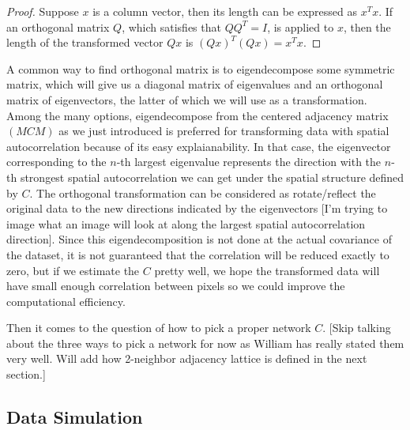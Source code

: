 \documentclass[12pt]{article}
\begin{document}
\begin{proof}
  Suppose \( x \) is a column vector, then its length can be expressed as \( x^T x \). If an orthogonal matrix \( Q \), which satisfies that \( Q Q^T = I \), is applied to \( x \), then the length of the transformed vector \( Q x \) is \( (Q x)^T (Q x) = x^T x \).
\end{proof}

A common way to find orthogonal matrix is to eigendecompose some symmetric matrix, which will give us a diagonal matrix of eigenvalues and an orthogonal matrix of eigenvectors, the latter of which we will use as a transformation. Among the many options, eigendecompose from the centered adjacency matrix \( (M C M) \) as we just introduced is preferred for transforming data with spatial autocorrelation because of its easy explaianability. In that case, the eigenvector corresponding to the \( n \)-th largest eigenvalue represents the direction with the \( n \)-th strongest spatial autocorrelation we can get under the spatial structure defined by \( C \). The orthogonal transformation can be considered as rotate/reflect the original data to the new directions indicated by the eigenvectors [I'm trying to image what an image will look at along the largest spatial autocorrelation direction]. Since this eigendecomposition is not done at the actual covariance of the dataset, it is not guaranteed that the correlation will be reduced exactly to zero, but if we estimate the \( C \) pretty well, we hope the transformed data will have small enough correlation between pixels so we could improve the computational efficiency.

Then it comes to the question of how to pick a proper network \( C \). [Skip talking about the three ways to pick a network for now as William has really stated them very well. Will add how 2-neighbor adjacency lattice is defined in the next section.]


\subsection*{Data Simulation}
\end{document}
